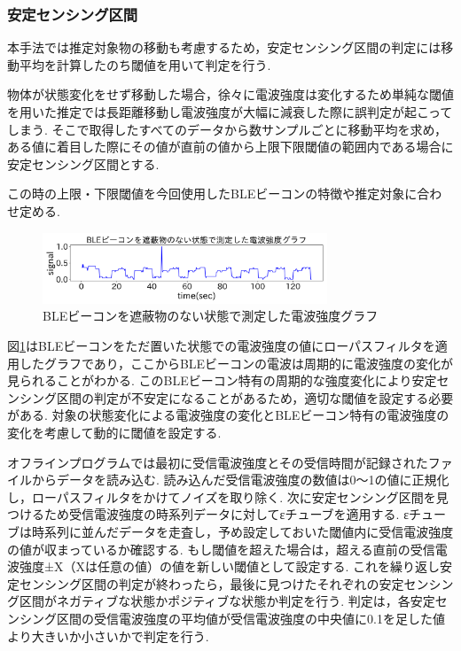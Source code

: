 \documentclass[Japanese]{dicomopapers}
\begin{document}
\subsubsection{安定センシング区間}
本手法では推定対象物の移動も考慮するため，安定センシング区間の判定には移動平均を計算したのち閾値を用いて判定を行う.





物体が状態変化をせず移動した場合，徐々に電波強度は変化するため単純な閾値を用いた推定では長距離移動し電波強度が大幅に減衰した際に誤判定が起こってしまう.
そこで取得したすべてのデータから数サンプルごとに移動平均を求め，ある値に着目した際にその値が直前の値から上限下限閾値の範囲内である場合に安定センシング区間とする.


この時の上限・下限閾値を今回使用したBLEビーコンの特徴や推定対象に合わせ定める.

\begin{figure}[b]
    \centering
    \includegraphics[width=8.5cm]{bokoboko.png}
    \caption{BLEビーコンを遮蔽物のない状態で測定した電波強度グラフ}
    \label{nomal-data}
\end{figure}

図\ref{nomal-data}はBLEビーコンをただ置いた状態での電波強度の値にローパスフィルタを適用したグラフであり，ここからBLEビーコンの電波は周期的に電波強度の変化が見られることがわかる.
このBLEビーコン特有の周期的な強度変化により安定センシング区間の判定が不安定になることがあるため，適切な閾値を設定する必要がある.
対象の状態変化による電波強度の変化とBLEビーコン特有の電波強度の変化を考慮して動的に閾値を設定する.

オフラインプログラムでは最初に受信電波強度とその受信時間が記録されたファイルからデータを読み込む.
読み込んだ受信電波強度の数値は0〜1の値に正規化し，ローパスフィルタをかけてノイズを取り除く.
次に安定センシング区間を見つけるため受信電波強度の時系列データに対してεチューブを適用する.
εチューブは時系列に並んだデータを走査し，予め設定しておいた閾値内に受信電波強度の値が収まっているか確認する.
もし閾値を超えた場合は，超える直前の受信電波強度±X（Xは任意の値）の値を新しい閾値として設定する.
これを繰り返し安定センシング区間の判定が終わったら，最後に見つけたそれぞれの安定センシング区間がネガティブな状態かポジティブな状態か判定を行う.
判定は，各安定センシング区間の受信電波強度の平均値が受信電波強度の中央値に0.1を足した値より大きいか小さいかで判定を行う.
\end{document}
